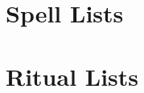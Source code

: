   

  \newpage
\section{Spell Lists}\label{Spell Lists}

  

  

\section{Ritual Lists}\label{Ritual Lists}

  

  
